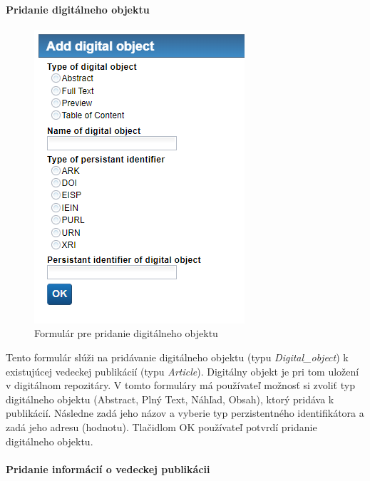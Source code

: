\documentclass[10pt,oneside,slovak,a4paper]{article}
\begin{document}
\paragraph{Pridanie digitálneho objektu}

\begin{figure} [H]
\centering
\includegraphics[scale=0.4]{forms/CoachforAdddigitalobject.png} 
\caption{Formulár pre pridanie digitálneho objektu}
\end{figure}

Tento formulár slúži na pridávanie digitálneho objektu (typu \textit{Digital{\_}object}) k existujúcej vedeckej publikácií (typu \textit{Article}). Digitálny objekt je pri tom uložení v digitálnom repozitáry. V tomto formuláry má používateľ možnosť si zvoliť typ digitálneho objektu (Abstract, Plný Text, Náhľad, Obsah), ktorý pridáva k publikácií. Následne zadá jeho názov a vyberie typ perzistentného identifikátora a zadá jeho adresu (hodnotu). Tlačidlom OK používateľ potvrdí pridanie digitálneho objektu.

\paragraph{Pridanie informácií o vedeckej publikácii}
\end{document}
